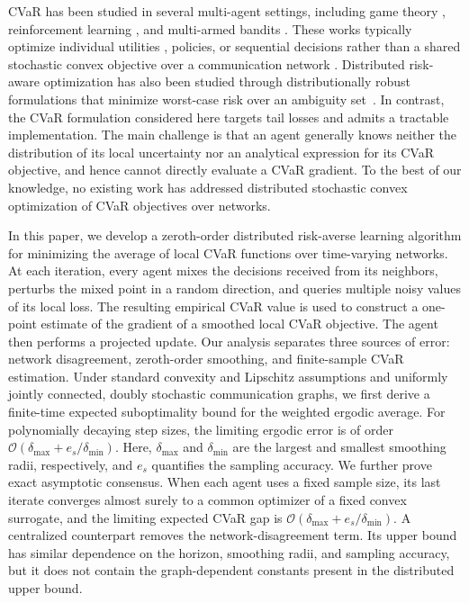\documentclass[twocolumn]{autart}    %
\newcommand{\order}[1]{\mathcal{O}\left(#1\right)}
\newcommand{\1}{\mathbf{1}}
\begin{document}
CVaR has been studied in several multi-agent settings, 
including game theory \cite{wang2022risk,wang2024learning}, reinforcement learning \cite{al2024risk,ishikawa2025decentralized}, and multi-armed bandits \cite{tan2023cvar}. 
These works typically optimize individual utilities \cite{wang2022risk, wang2024learning}, policies, or sequential decisions rather than a shared stochastic convex objective over a communication network \cite{tan2023cvar}. 
Distributed risk-aware optimization has also been studied through distributionally robust formulations that minimize worst-case risk over an ambiguity set~\cite{jiao2022distributed,lan2023optimal,ning2026collaborative}. 
In contrast, the CVaR formulation considered here targets tail losses and admits a tractable implementation. 
The main challenge is that an agent generally knows neither the distribution of its local uncertainty nor an analytical expression for its CVaR objective, and hence cannot directly evaluate a CVaR gradient. 
To the best of our knowledge, no existing work has addressed distributed stochastic convex optimization of CVaR objectives over networks.

In this paper, we develop a zeroth-order distributed risk-averse learning algorithm for minimizing the average of local CVaR functions over time-varying networks.
At each iteration, every agent mixes the decisions received from its neighbors, perturbs the mixed point in a random direction, and queries multiple noisy values of its local loss. The resulting empirical CVaR value is used to construct a one-point estimate of the gradient of a smoothed local CVaR objective. The agent then performs a projected update.
Our analysis separates three sources of error: network disagreement, zeroth-order smoothing, and finite-sample CVaR estimation. Under standard convexity and Lipschitz assumptions and uniformly jointly connected, doubly stochastic communication graphs, we first derive a finite-time expected suboptimality bound for the weighted ergodic average.
For polynomially decaying step sizes, the limiting ergodic error is of order $\order{\delta_{\max} + e_s/\delta_{\min}}$.
Here, $\delta_{\max}$ and $\delta_{\min}$ are the largest and smallest smoothing radii, respectively, and $e_s$ quantifies the sampling accuracy.
We further prove exact asymptotic consensus. When each agent uses a fixed sample size, its last iterate converges almost surely to a common optimizer of a fixed convex surrogate, and the limiting expected CVaR gap is  $\order{\delta_{\max}+e_s/\delta_{\min}}$.
A centralized counterpart removes the network-disagreement term. Its upper bound has similar dependence on the horizon, smoothing radii, and sampling accuracy, but it does not contain the graph-dependent constants present in the distributed upper bound.
\end{document}

